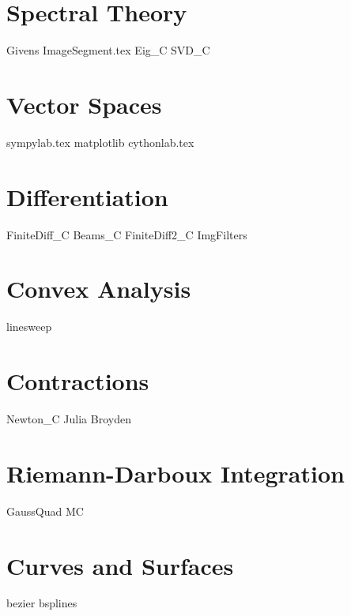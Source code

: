 \documentclass[nociteref]{newsiambook}
\begin{document}
\part{Spectral Theory}
{Givens}
{ImageSegment.tex}
{Eig_C}
{SVD_C}

\part{Vector Spaces}
{sympylab.tex}
{matplotlib}
{cythonlab.tex}

\part{Differentiation}
{FiniteDiff_C}
{Beams_C}
{FiniteDiff2_C}
{ImgFilters}

\part{Convex Analysis}

{linesweep}

\part{Contractions}
{Newton_C}
{Julia}
{Broyden}

\part{Riemann-Darboux Integration}
{GaussQuad}
{MC}

% 

\part{Curves and Surfaces}
{bezier}
{bsplines}
\end{document}
